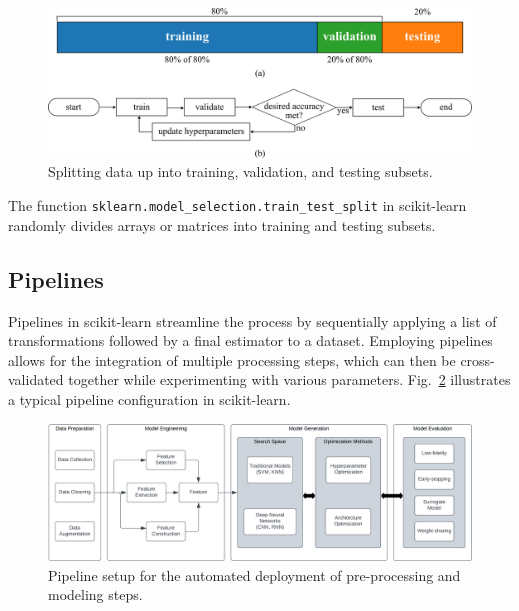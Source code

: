 \documentclass[12pt,letter]{article}
\begin{document}
		\begin{figure}[H]
			\centering
			\includegraphics[]{../figures/training_validation_test_datasets}
			\caption{Splitting data up into training, validation, and testing subsets.}
			\label{fig:training_validation_test_datasets}
		\end{figure}


The function \texttt{sklearn.model\_selection.train\_test\_split} in scikit-learn randomly divides arrays or matrices into training and testing subsets.



\subsection{Pipelines}


Pipelines in scikit-learn streamline the process by sequentially applying a list of transformations followed by a final estimator to a dataset. Employing pipelines allows for the integration of multiple processing steps, which can then be cross-validated together while experimenting with various parameters. Fig.~\ref{fig:AutoML_diagram} illustrates a typical pipeline configuration in scikit-learn.



		\begin{figure}[H]
			\centering
			\includegraphics[width=6.5in]{../figures/AutoML_diagram}
			\caption{Pipeline setup for the automated deployment of pre-processing and modeling steps.\protect\footnotemark[1]}
			\label{fig:AutoML_diagram}
		\end{figure}
\end{document}

